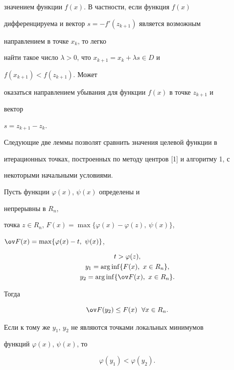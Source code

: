 значением функции $f(x)$. В частности, если функция $f(x)$ 


дифференцируема и вектор $s=-f'(z_{k+1})$ является возможным 


направлением в точке $x_k$, то легко 


найти такое число $\lambda>0$, что $x_{k+1}=x_k+\lambda s\in D$ и 


$f(x_{k+1})<f(z_{k+1})$. Может 


оказаться направлением убывания для функции $f(x)$ в точке $z_{k+1}$ и 


вектор 


$s=z_{k+1}-z_k$. 


 


Следующие две леммы позволят сравнить значения целевой функции в 


итерационных точках, построенных по методу центров [1] и алгоритму 1, с 


некоторыми начальными условиями. 


 


 


\begin{lem} Пусть функции $\varphi(x)$, $\psi(x)$ определены и 


непрерывны в $R_n$, 


точка $z\in R_n$, $F(x)=\max\{\varphi(x)-\varphi(z),\ \psi(x)\}$, 


$\ov F(x)=\max\{\varphi(x)-t,\ \psi(x)\}$, 


\begin{gather} 


t>\varphi(z),\\ 


y_1=\arg\inf\{F(x),\ x\in R_n\},\\ 


y_2=\arg\inf\{\ov F(x),\ x\in R_n\}. 


\end{gather} 


Тогда 


\begin{equation} 


\ov F(y_2)\le F(x)\ \; \forall x\in R_n. 


\end{equation} 


 


Если к тому же $y_1$, $y_2$ не являются точками локальных минимумов 


функций $\varphi(x)$, $\psi(x)$, то 


\begin{equation} 


\varphi(y_1)<\varphi(y_2). 


\end{equation} 


\end{lem} 


